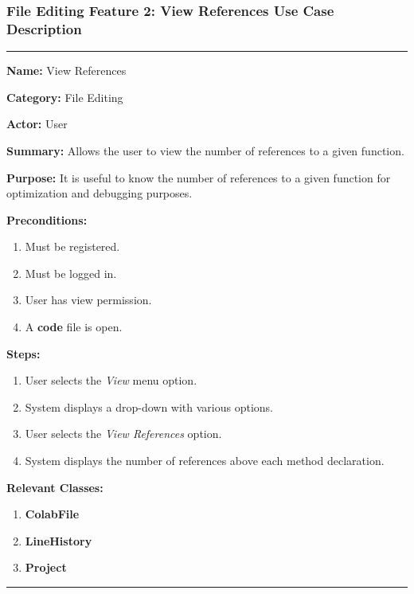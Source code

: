 \documentclass[twoside,letterpaper]{article}
\begin{document}
\newpage

\subsubsection[File Editing Feature 2: View References]{\rmfamily\bfseries\color{black}
	File Editing Feature 2: View References Use Case Description}
\hypertarget{RefHeading22059017292}{}

\vspace{2pt}
\hrule
\vspace{8pt}
	\noindent\textbf{Name:} View References \newline
	
	\noindent\textbf{Category:} File Editing \newline
	
	\noindent\textbf{Actor:} User \newline
	
	\noindent\textbf{Summary:} Allows the user to view the number of references to a given function. \newline
	
	\noindent\textbf{Purpose:} It is useful to know the number of references to a given function for optimization and debugging purposes. \newline
	
	\noindent\textbf{Preconditions:}
	\begin{enumerate}
		\item Must be registered.
		\item Must be logged in.
		\item User has view permission.
		\item A \textbf{code} file is open.
	\end{enumerate}
	\noindent\textbf{Steps:}
	\begin{enumerate}
		\item User selects the \textit{View} menu option.
		\item System displays a drop-down with various options.
		\item User selects the \textit{View References} option.
		\item System displays the number of references above each method declaration.
	\end{enumerate}
	\noindent\textbf{Relevant Classes:}
	\begin{enumerate}
		\item \textbf {ColabFile}
		\item \textbf {LineHistory}
		\item \textbf {Project}
	\end{enumerate}
\vspace{8pt}
\hrule
\newpage
\end{document}
